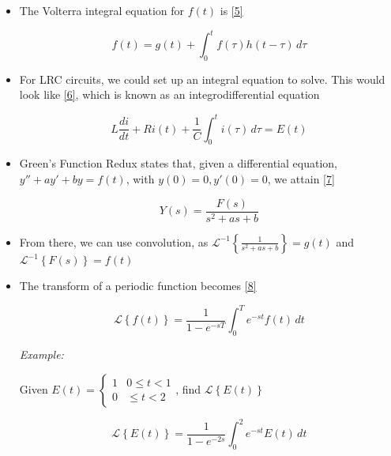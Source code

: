 \documentclass[12pt]{article}
\begin{document}
\begin{itemize}
  \item The Volterra integral equation for $f(t)$ is \eqref{5}

    \begin{equation}
      f(t)=g(t)+\int_0^t f(\tau)h(t-\tau)\,d\tau
      \label{5}
    \end{equation}

  \item For LRC circuits, we could set up an integral equation to solve. This would look like \eqref{6}, which is known as an integrodifferential equation

    \begin{equation}
      L\frac{di}{dt}+Ri(t)+\frac{1}{C}\int_0^ti(\tau)\,d\tau=E(t)
      \label{6}
    \end{equation}

  \item Green's Function Redux states that, given a differential equation, $y''+ay'+by=f(t)$, with $y(0)=0, y'(0)=0$, we attain \eqref{7}

    \begin{equation}
      Y(s)=\frac{F(s)}{s^2+as+b}
      \label{7}
    \end{equation}

  \item From there, we can use convolution, as $\mathcal{L}^{-1}\left\{ \frac{1}{s^2+as+b} \right\}=g(t)$ and $\mathcal{L}^{-1}\left\{ F(s) \right\}=f(t)$

  \item The transform of a periodic function becomes \eqref{8}

    \begin{equation}
      \mathcal{L}\left\{ f(t) \right\}=\frac{1}{1-e^{-sT}}\int_0^T e^{-st}f(t)\,dt
      \label{8}
    \end{equation}

    \textit{Example:}

    \begin{center}
      Given $E(t)=\left\{\begin{array}{ll} 1 & 0\leq t< 1\\ 0 & \leq t <2 \end{array}$, find $\mathcal{L}\left\{ E(t) \right\}$
    \end{center}

    \begin{equation}
      \mathcal{L}\left\{ E(t) \right\}=\frac{1}{1-e^{-2s}}\int_0^2e^{-st}E(t)\,dt
      \label{9}
    \end{equation}

\end{itemize}
\end{document}

